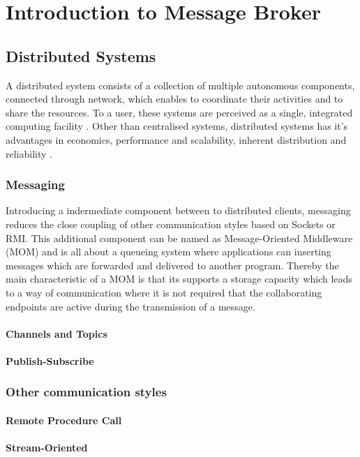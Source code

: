 \chapter{Introduction to Message Broker}
\section{Distributed Systems}
A distributed system consists of a collection of multiple autonomous components,
connected through network, which enables to coordinate their activities and to
share the resources. To a user, these systems are perceived as a single,
integrated computing facility \cite{TAN06}. Other than centralised systems,
distributed systems has it's advantages in economics, performance and
scalability, inherent distribution and reliability \cite{POSA1}.

\subsection{Messaging}
Introducing a indermediate component between to distributed clients, messaging
reduces the close coupling of other communication styles based on Sockets or
RMI. This additional component can be named as Message-Oriented Middleware (MOM)
and is all about a queueing system where applications can inserting messages
which are forwarded and delivered to another program. Thereby the main
characteristic of a MOM is that its supports a storage capacity which leads to a
way of communication where it is not required that the collaborating endpoints
are active during the transmission of a message.\cite{TAN06}
 
\subsubsection{Channels and Topics}

\subsubsection{Publish-Subscribe}

\subsection{Other communication styles}
\subsubsection{Remote Procedure Call}
\subsubsection{Stream-Oriented}

